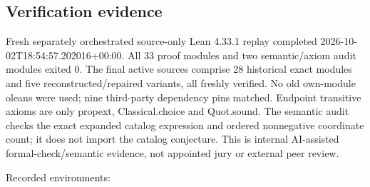 \documentclass[11pt,a4paper]{article}
\begin{document}
\subsection{Verification evidence}
Fresh separately orchestrated source-only Lean 4.33.1 replay completed 2026-10-02T18:54:57.202016+00:00. All 33 proof modules and two semantic/axiom audit modules exited 0. The final active sources comprise 28 historical exact modules and five reconstructed/repaired variants, all freshly verified. No old own-module oleans were used; nine third-party dependency pins matched. Endpoint transitive axioms are only propext, Classical.choice and Quot.sound. The semantic audit checks the exact expanded catalog expression and ordered nonnegative coordinate count; it does not import the catalog conjecture. This is internal AI-assisted formal-check/semantic evidence, not appointed jury or external peer review.

Recorded environments:
\end{document}
